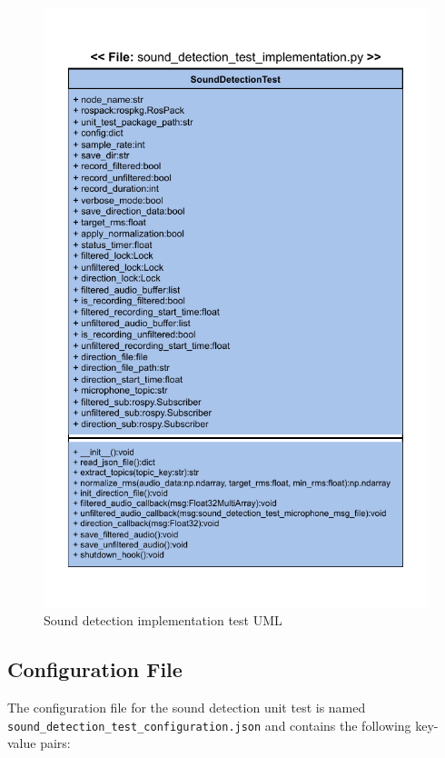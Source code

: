 \documentclass{CSSRforAfrica}
\begin{document}
\begin{figure}[!hbpt]
	\centering
	\includegraphics[scale=1.0]{images/Sound_detection_test_implementation.pdf}
	\caption{Sound detection implementation test UML}
	\label{fig:sound_implementation_test_UML}
\end{figure}

\subsection*{Configuration File}
The configuration file for the sound detection unit test is named \\
\texttt{sound\_detection\_test\_configuration.json} and contains the following key-value pairs:
\end{document}

